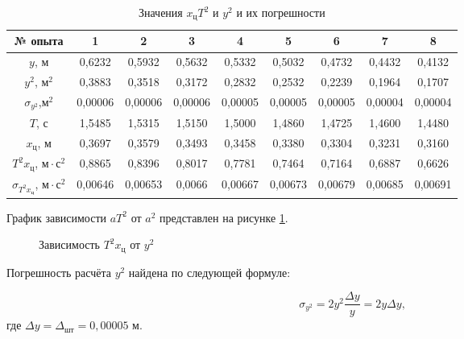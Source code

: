 \documentclass[a4paper,12pt]{article} %
\begin{document}
\begin{table}[h!]
	\begin{tabular}{|c|c|c|c|c|c|c|c|c|} \hline
		№ опыта  & 1 & 2 & 3 & 4 & 5 & 6 & 7 & 8  \\ \hline
		$ y $, м & 0,6232 & 0,5932 & 0,5632 & 0,5332 & 0,5032 & 0,4732 & 0,4432 & 0,4132 \\ \hline
		$ y^2 $, $ \text{м}^2 $  & 0,3883 & 0,3518 & 0,3172 & 0,2832 & 0,2532 & 0,2239 & 0,1964 & 0,1707 \\ \hline
		$ \sigma_{y^2}$,$ \text{м}^2  $  & 0,00006 & 0,00006 & 0,00006 & 0,00005 & 0,00005 & 0,00005 & 0,00004 & 0,00004 \\ \hline
		$ T $, с & 1,5485 & 1,5315 & 1,5150 & 1,5000  & 1,4860  & 1,4725  & 1,4600  & 1,4480  \\ \hline
		$ x_\text{ц} $, м   & 0,3697  & 0,3579  & 0,3493  & 0,3458 & 0,3380 & 0,3304 & 0,3231 & 0,3160 \\ \hline
		$ T^2x_\text{ц} $, $ \text{м} \cdot \text{с}^2 $ & 0,8865 & 0,8396 & 0,8017 & 0,7781 & 0,7464 & 0,7164 & 0,6887 & 0,6626 \\ \hline
		$ \sigma_{T^2x_\text{ц}} $, $ \text{м} \cdot \text{с}^2  $ & 0,00646 & 0,00653 & 0,0066 & 0,00667 & 0,00673 & 0,00679 & 0,00685 & 0,00691 \\ \hline
	\end{tabular}
\caption{Значения $ x_\text{ц}T^2 $ и $ y^2 $ и их погрешности}
\label{tab3}
\end{table}

График зависимости $ aT^2 $ от $ a^2 $ представлен на рисунке \ref{graph}.

\begin{figure}
\centering
{}
\caption{Зависимость $ T^2x_\text{ц} $ от $ y^2 $}
\label{graph}
\end{figure}

Погрешность расчёта $ y^2 $ найдена по следующей формуле:

\begin{equation}
\sigma_{y^2}=2y^2\frac{\Delta y}{y}=2y\Delta y,
\end{equation}
где $ \Delta y = \Delta_\text{шт} = 0,00005$ м.
\end{document}
